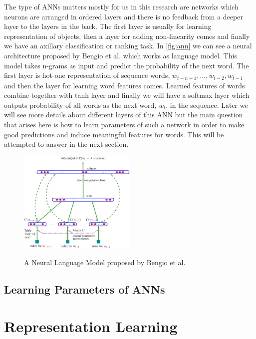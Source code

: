 The type of ANNs matters mostly for us in this research are
networks which neurons are arranged in ordered layers and there is no feedback
from a deeper layer  to the layers in the back. The first layer is usually for
learning representation of objects, then a layer for adding non-linearity comes
and finally we have an axillary classification or ranking task. In \autoref{fig:ann}
 we can see a neural architecture proposed by Bengio et al. \cite{Bengio2003}
 which works as language model. This model takes n-grams as input and predict
 the probability of the next word. The first layer is hot-one representation of
 sequence words, $w_{t-n+1}, \ldots ,w_{t-2}, w_{t-1}$ and then the layer for learning word features comes.
 Learned features of words combine together with tanh layer and finally we will have a softmax layer
 which outputs probability of all words as the next word, $w_t$, in the
 sequence. Later we will see more details about different layers of this ANN but
 the main question that arises here is how to learn parameters of such a network
 in order to make good predictions and induce meaningful features for words.
 This will be attempted to answer in the next section.

 \begin{figure}[h!]
  \caption{A Neural Language Model proposed by Bengio et al.}
  \centering
    \includegraphics[width=0.5\textwidth]{ann.eps}
    \label{fig:ann}
\end{figure} 

\subsection{Learning Parameters of ANNs}
\label{ssec:ml-ann-learn}


\section{Representation Learning}
\label {ch:repr-learning}

